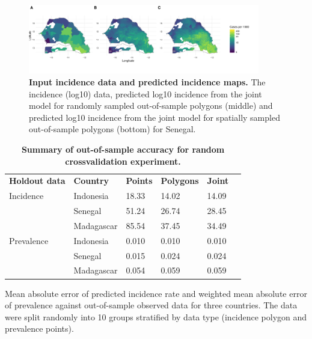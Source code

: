 \documentclass[10pt,letterpaper]{article}
\newlength\savedwidth
\newcommand\thickhline{\noalign{\global\savedwidth\arrayrulewidth\global\arrayrulewidth 2pt}%
\hline
\noalign{\global\arrayrulewidth\savedwidth}}
\begin{document}
\begin{figure}[!h]
\includegraphics[width = 0.9\textwidth]{figures/sen_both_cv12_preds.png}
\caption{{\bf Input incidence data and predicted incidence maps. } 
The incidence (log10) data, predicted log10 incidence from the joint model for randomly sampled out-of-sample polygons (middle) and predicted log10 incidence from the joint model for spatially sampled out-of-sample polygons (bottom) for Senegal.
}
\label{predobsmapsen}
\end{figure}



\begin{table}[!ht]
\begin{adjustwidth}{-2.25in}{0in} %
\centering
\caption{
{\bf Summary of out-of-sample accuracy for random crossvalidation experiment.}}
\begin{tabular}{llllll}
\hline
{\bf Holdout data} & {\bf Country} &  {\bf Points} & {\bf Polygons} & {\bf Joint} \\
\thickhline 
Incidence & Indonesia & 18.33 & 14.02 &  14.09\\
& Senegal & 51.24 & 26.74 &  28.45\\
& Madagascar & 85.54 & 37.45 &  34.49\vspace{3mm}\\
Prevalence & Indonesia & 0.010 & 0.010 &  0.010\\
& Senegal & 0.015 & 0.024 &  0.024\\
& Madagascar & 0.054 & 0.059 &  0.059\\
\end{tabular}
\begin{flushleft}
Mean absolute error of predicted incidence rate and weighted mean absolute error of prevalence against out-of-sample observed data for three countries.
The data were split randomly into 10 groups stratified by data type (incidence polygon and prevalence points).
\end{flushleft}
\label{table1}
\end{adjustwidth}
\end{table}
\end{document}
